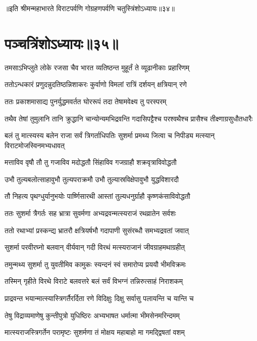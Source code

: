 ॥इति श्रीमन्महाभारते विराटपर्वणि गोग्रहणपर्वणि चतुस्त्रिंशोऽध्यायः॥३४॥

\chapter{पञ्चत्रिंशोऽध्यायः॥३५॥}

\twolineshloka
{तमसाऽभिप्लुते लोके रजसा चैव भारत}
{व्यतिष्ठन्त मुहूर्तं ते व्यूढानीकाः प्रहारिणम्}


\twolineshloka
{ततोऽन्धकारं प्रणुदन्नुदतिष्ठन्निशाकरः}
{कुर्वाणो विमलां रात्रिं दर्शयन् क्षत्रियान् रणे}


\twolineshloka
{ततः प्रकाशमासाद्य पुनर्युद्धमवर्तत}
{घोररूपं तदा तेषामवेक्ष्य तु परस्परम्}


\fourlineindentedshloka
{तथैव तेषां तुमुलानि तानि}
{क्रुद्धानि चान्योन्यमभिद्रवन्ति}
{गदासिपट्टैश्च परश्वथैश्च}
{प्रासैश्च तीक्ष्णाग्रसुधौतधारैः}


\fourlineindentedshloka
{बलं तु मात्स्यस्य बलेन राजा}
{सर्वं त्रिगर्ताधिपतिः सुशर्मा}
{प्रमथ्य जित्वा च निपीड्य मत्स्यान्}
{विराटमोजस्विनमभ्यधावत्}


\twolineshloka
{मत्ताविव वृषौ तौ तु गजाविव मदोद्धतौ}
{सिंहाविव गजग्राहौ शक्रवृत्राविवोद्धतौ}


\twolineshloka
{उभौ तुल्यबलोत्साहावुभौ तुल्यपराक्रमौ}
{उभौ तुल्यास्रविक्षेपावुभौ युद्धविशारदौ}


\twolineshloka
{तौ निहत्य पृथग्धुर्यानुभयोः पार्ष्णिसारथी}
{आस्तां तुल्यधनुर्ग्राहौ कृष्णकंसाविवोद्धतौ}


\twolineshloka
{ततः सुशर्मा त्रैगर्तः सह भ्रात्रा सुवर्मणा}
{अभ्यद्रवन्मत्स्यराजं रथव्रातेन सर्वशः}


\twolineshloka
{ततो रथाभ्यां प्रस्कन्द्य भ्रातरौ क्षत्रियर्षभौ}
{गदापाणी सुसंरब्धौ समभ्यद्रवतां जवात्}


\twolineshloka
{सुशर्मा परवीरघ्नो बलवान् वीर्यवान् गदी}
{विरथं मत्स्यराजानं जीवग्राहमथाग्रहीत्}


\twolineshloka
{तमुन्मथ्य सुशर्मा तु युवतीमिव कामुकः}
{स्यन्दनं स्वं समारोप्य प्रययौ भीमविक्रमः}


\twolineshloka
{तस्मिन् गृहीते विरथे विराटे बलवत्तरे}
{बलं सर्वं विभग्नं तन्निरुत्साहं निराशकम्}


\twolineshloka
{प्राद्रवन्त भयान्मात्स्यास्त्रिगर्तैरर्दिता रणे}
{विदिक्षुः दिक्षु सर्वासु पलायन्ति च यान्ति च}


\twolineshloka
{तेषु विद्राव्यमाणेषु कुन्तीपुत्रो युधिष्ठिरः}
{अभ्यभाषत धर्मात्मा भीमसेनमरिन्दमम्}


\twolineshloka
{मात्स्यराजस्त्रिगर्तेन परामृष्टः सुशर्मणा}
{तं मोक्षय महाबाहो मा गमद्द्विषतां वशम्}



